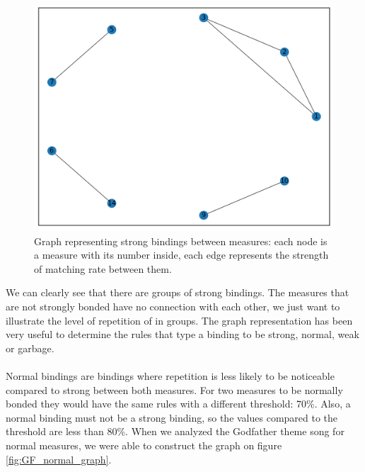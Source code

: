 \documentclass[a4paper]{article}
\begin{document}
\begin{figure}[H]
	\includegraphics[width=\textwidth]{Fotos/bindings_graph/Godfather_16_strong.png}
	\caption{Graph representing strong bindings between measures: each node is a measure with its number inside, each edge represents the strength of matching rate between them.}
	\label{fig:GF_strong_graph}
\end{figure}

We can clearly see that there are groups of strong bindings. The measures that are not strongly bonded have no connection with each other, we just want to illustrate the level of repetition of in groups. The graph representation has been very useful to determine the rules that type a binding to be strong, normal, weak or garbage.
\\\\
Normal bindings are bindings where repetition is less likely to be noticeable compared to strong between both measures. For two measures to be normally bonded they would have the same rules with a different threshold: 70\%. Also, a normal binding must not be a strong binding, so the values compared to the threshold are less than 80\%. When we analyzed the Godfather theme song for normal measures, we were able to construct the graph on figure \ref{fig:GF_normal_graph}.
\end{document}
